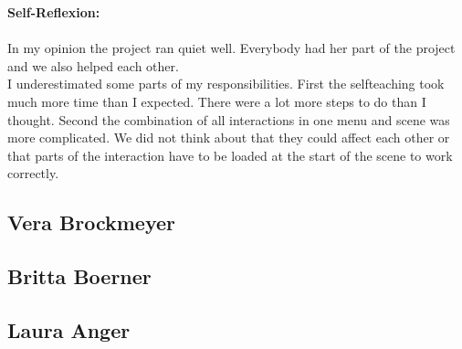 \textbf{Self-Reflexion:}\\ \\
In my opinion the project ran quiet well. Everybody had her part of the project and we also helped each other.\\
I underestimated some parts of my responsibilities. First the selfteaching took much  more time than I expected. There were a lot more steps to do than I thought. Second the combination of all interactions in one menu and scene was more complicated. We did not think about that they could affect each other or that parts of the interaction have to be loaded at the start of the scene to work correctly.\\

\subsection{Vera Brockmeyer} \label{sec:SAVera}

\subsection{Britta Boerner} \label{sec:SABritta}

\newpage
\subsection{Laura Anger} \label{sec:SALaura}

